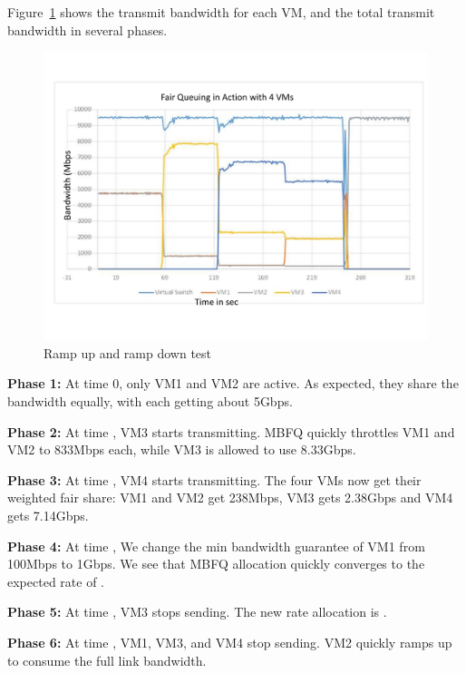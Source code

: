 Figure~\ref{fairsharing}  shows the transmit bandwidth for each VM, and the
total transmit bandwidth in several phases. 

\begin{figure}[h]
\centering
\includegraphics[width=0.7\columnwidth,trim=60pt 20mm 0pt 8mm]{figures/fairsharing}
\caption{Ramp up and ramp down test}
\label{fairsharing}
\vspace{-3mm}
\end{figure}

{\bf Phase 1:}  At time 0, only VM1 and VM2 are active. As expected, they share
the bandwidth equally, with each getting about 5Gbps.

{\bf Phase 2:} At time , VM3 starts transmitting. MBFQ quickly
throttles VM1 and VM2 to 833Mbps each, while VM3 is allowed to use 8.33Gbps. 

{\bf  Phase 3:} At time , VM4 starts transmitting. The four VMs now
get their weighted fair share: VM1 and VM2 get 238Mbps, VM3
gets 2.38Gbps and VM4 gets 7.14Gbps. 

{\bf  Phase 4:} At time , We change the min bandwidth guarantee of VM1 from 100Mbps to
1Gbps. We see that MBFQ allocation quickly converges to the expected rate of
.

{\bf Phase 5:} At time , VM3 stops sending. The new rate allocation is
.

{\bf Phase 6:} At time , VM1, VM3, and VM4 stop sending. VM2 quickly
ramps up to consume the full link bandwidth.

